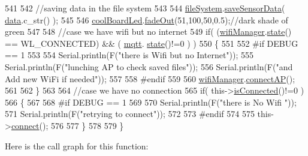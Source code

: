 \begin{DoxyCode}
541     
542     \textcolor{comment}{//saving data in the file system}
543     
544     \hyperlink{classCoolBoard_a42c2586fbb13ff7f06538e9284e8538d}{fileSystem}.\hyperlink{classCoolFileSystem_afa3a4feae94871d4d3b6bebb701c2e67}{saveSensorData}( \hyperlink{classCoolBoard_a427fb753dd8575bdf821c70a5c63d695}{data}.c\_str() );
545 
546     \hyperlink{classCoolBoard_a1b1d3c684a5baa56b08486e192fd8e97}{coolBoardLed}.\hyperlink{classCoolBoardLed_a93d545679237e8cc858324367149775c}{fadeOut}(51,100,50,0.5);\textcolor{comment}{//dark shade of green}
547 
548     \textcolor{comment}{//case we have wifi but no internet}
549     \textcolor{keywordflow}{if}( (\hyperlink{classCoolBoard_acd88e6003606b47479ebba81e4aceeca}{wifiManager}.\hyperlink{classCoolWifi_a1c7b4d82a4098d346e7593dce92039fa}{state}() == WL\_CONNECTED) && ( \hyperlink{classCoolBoard_a2399f44d7c23c1149a335cb3b46d90f1}{mqtt}.
      \hyperlink{classCoolMQTT_a5d003307eff78efbd585e42b43b72b6d}{state}()!=0 ) )
550     \{
551     
552 \textcolor{preprocessor}{    #if DEBUG == 1}
553         
554         Serial.println(F(\textcolor{stringliteral}{"there is Wifi but no Internet"}));
555         Serial.println(F(\textcolor{stringliteral}{"lunching AP to check saved files"}));
556         Serial.println(F(\textcolor{stringliteral}{"and Add new WiFi if needed"}));
557     
558 \textcolor{preprocessor}{    #endif}
559         
560         \hyperlink{classCoolBoard_acd88e6003606b47479ebba81e4aceeca}{wifiManager}.\hyperlink{classCoolWifi_a7c857f27161782f5ef1d62d552aff971}{connectAP}();
561         
562     \}
563     
564     \textcolor{comment}{//case we have no connection}
565     \textcolor{keywordflow}{if}( this->\hyperlink{classCoolBoard_ad7442cf4b62c7b0d5bd62a0f75ffc065}{isConnected}()!=0  )
566     \{
567     
568 \textcolor{preprocessor}{    #if DEBUG == 1}
569         
570         Serial.println(F(\textcolor{stringliteral}{"there is No Wifi "}));
571         Serial.println(F(\textcolor{stringliteral}{"retrying to connect"}));
572     
573 \textcolor{preprocessor}{    #endif}
574         
575         this->\hyperlink{classCoolBoard_a519de78b807f8ec6463ff484eb925918}{connect}();
576         
577     \}   
578 
579 \}
\end{DoxyCode}
Here is the call graph for this function\+:
\nopagebreak
